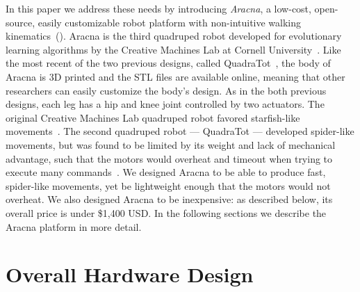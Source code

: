 \documentclass[letterpaper]{article}
\begin{document}
In this paper we address these needs by introducing \emph{Aracna}, a low-cost, open-source, easily customizable robot platform with non-intuitive walking
kinematics~(). Aracna is the third quadruped robot developed for evolutionary learning algorithms by the Creative Machines Lab at Cornell University~\citep{bongard2006resilient, yosinski2011gaits}. Like the most recent of the two previous designs, called QuadraTot~\citep{yosinski2011gaits}, the body of Aracna is 3D printed and the STL files are available online,
meaning that other researchers can easily customize the body's design. As in the both previous designs, each leg has a hip and knee joint controlled by two actuators. The original Creative
Machines Lab quadruped robot favored starfish-like movements~\citep{bongard2006resilient}. The second quadruped robot --- QuadraTot ---
developed spider-like movements, but was found to be limited by its
weight and lack of mechanical advantage, such that the motors would overheat and timeout when trying to execute many commands~\citep{yosinski2011gaits, Glette2012Evolution}. We designed Aracna to be able to produce fast, spider-like movements, yet be lightweight enough that the motors would not overheat. We also designed Aracna to be inexpensive: as described below, its overall price is under \$1,400  USD. In the following sections we describe the Aracna platform in more detail. 




\section{Overall Hardware Design}





\end{document}
